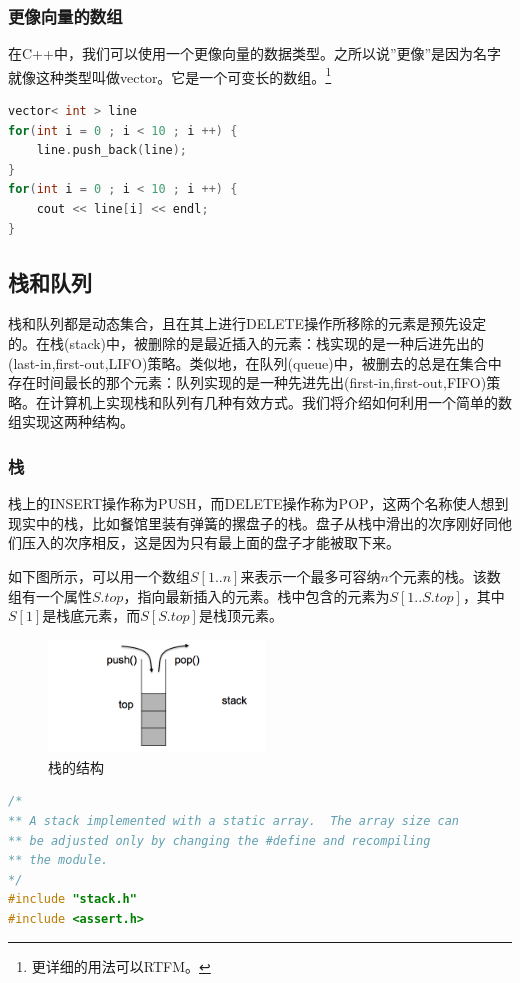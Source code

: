 \documentclass[a4paper]{article}
\begin{document}
\begin{CJK}{UTF8}{gbsn}
\subsubsection*{更像向量的数组}

在C++中，我们可以使用一个更像向量的数据类型。之所以说''更像''是因为名字就像\raisebox{0.1em}{------}这种类型叫做vector。它是一个可变长的数组。\footnote{更详细的用法可以RTFM。}
\begin{lstlisting}[language=C++]
vector< int > line
for(int i = 0 ; i < 10 ; i ++) {
    line.push_back(line);
}
for(int i = 0 ; i < 10 ; i ++) {
    cout << line[i] << endl;
}
\end{lstlisting}

\subsection{栈和队列}
栈和队列都是动态集合，且在其上进行DELETE操作所移除的元素是预先设定的。在栈(stack)中，被删除的是最近插入的元素：栈实现的是一种后进先出的(last-in,first-out,LIFO)策略。类似地，在队列(queue)中，被删去的总是在集合中存在时间最长的那个元素：队列实现的是一种先进先出(first-in,first-out,FIFO)策略。在计算机上实现栈和队列有几种有效方式。我们将介绍如何利用一个简单的数组实现这两种结构。
\subsubsection*{栈}
栈上的INSERT操作称为PUSH，而DELETE操作称为POP，这两个名称使人想到现实中的栈，比如餐馆里装有弹簧的摞盘子的栈。盘子从栈中滑出的次序刚好同他们压入的次序相反，这是因为只有最上面的盘子才能被取下来。

如下图所示，可以用一个数组$S[1..n]$来表示一个最多可容纳$n$个元素的栈。该数组有一个属性$S.top$，指向最新插入的元素。栈中包含的元素为$S[1..S.top]$，其中$S[1]$是栈底元素，而$S[S.top]$是栈顶元素。

\begin{figure}[htbp]
\centering\includegraphics[height=3cm]{stack1.png}
\caption{栈的结构}
\end{figure}

\begin{lstlisting}[language=C]
/*
** A stack implemented with a static array.  The array size can
** be adjusted only by changing the #define and recompiling
** the module.
*/
#include "stack.h"
#include <assert.h>


\end{lstlisting}
\end{CJK}
\end{document}
